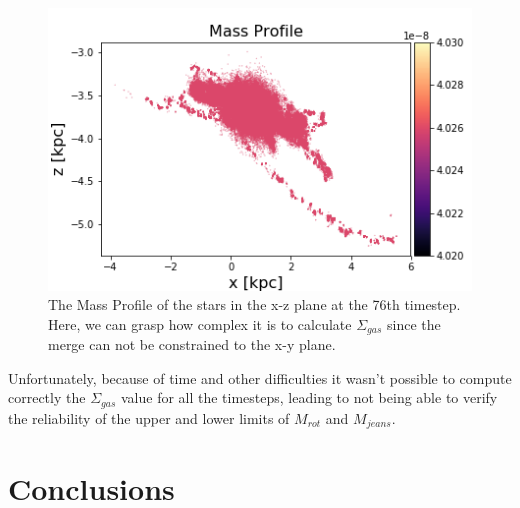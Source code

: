 \documentclass{aa}
\begin{document}
   \begin{figure}[h!]
   \includegraphics[scale=0.55]{Distribution_masa_delao.png}
   \caption{The Mass Profile of the stars in the x-z plane at the 76th timestep. Here, we can grasp how complex it is to calculate $\Sigma_{gas}$ since the merge can not be constrained to the x-y plane.}
   \centering
   \label{fig:boat1}
   \end{figure}
   Unfortunately, because of time and other difficulties it wasn't possible to compute correctly the $\Sigma_{gas}$ value for all the timesteps, leading to not being able to verify the reliability of the upper and lower limits of $M_{rot}$ and $M_{jeans}$. 
   



\section{Conclusions}

\end{document}
